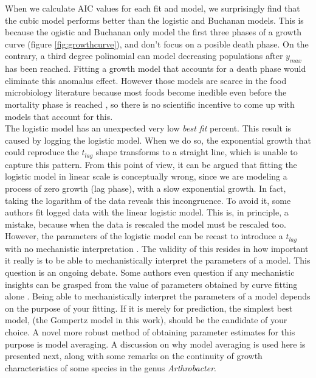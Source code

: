 \documentclass[titlepage,11pt]{article}
\begin{document}
\begin{linenumbers}
		When we calculate AIC values for each fit and model, we surprisingly find that the cubic model performs better than the logistic and Buchanan models. This is because the ogistic and Buchanan only model the first three phases of a growth curve (figure \ref{fig:growthcurve}), and don't focus on a posible death phase. On the contrary, a third degree polinomial can model decreasing populations after $ y_{max} $ has been reached. Fitting a growth model that accounts for a death phase \cite{Peleg2009, Baranyi1996} would eliminate this anomalus effect. However those models are scarce in the food microbiology literature because most foods become inedible even before the mortality phase is reached \cite{Micha2011}, so there is no scientific incentive to come up with models that account for this.\\
		The logistic model has an unexpected very low \textit{best fit} percent. This result is caused by logging the logistic model. When we do so, the exponential growth that could reproduce the $ t_{lag} $ shape transforms to a straight line, which is unable to capture this pattern. From this point of view, it can be argued that fitting the logistic model in linear scale is conceptually wrong, since we are modeling a process of zero growth (lag phase), with a slow exponential growth. In fact, taking the logarithm of the data reveals this incongruence. To avoid it, some authors \cite{Micha2011, Zwietering1990} fit logged data with the linear logistic model. This  is, in principle, a mistake, because when the data is rescaled the model must be rescaled too. However, the parameters of the logistic model can be recast to introduce a $ t_{lag} $ with no mechanistic interpretation \cite{Zwietering1990}. The validity of this resides in how important it really is to be able to mechanistically interpret the parameters of a model. This question is an ongoing debate. Some authors even question if any mechanistic insights can be  grasped from the value of parameters obtained by curve fitting alone \cite{Micha2011}. Being able to mechanistically interpret the parameters of a model depends on the purpose of your fitting. If it is merely for prediction, the simplest best  model, (the Gompertz model in this work), should be the candidate of your choice. A  novel more robust method of obtaining parameter estimates for this purpose is model averaging. A discussion on why model averaging is used here is presented next, along with some remarks on the continuity of growth characteristics of some species in the genus \textit{Arthrobacter}.\\
		

\end{linenumbers}
\end{document}
